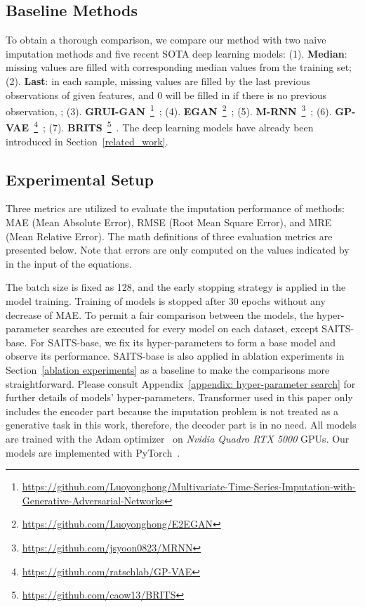 \documentclass{article}
\begin{document}
\subsection{Baseline Methods}
To obtain a thorough comparison, we compare our method with two naive imputation methods and five recent SOTA deep learning models: 
(1). \textbf{Median}: missing values are filled with corresponding median values from the training set; (2). \textbf{Last}: in each sample, missing values are filled by the last previous observations of given features, and 0 will be filled in if there is no previous observation, ; (3). \textbf{GRUI-GAN}~\footnote{\url{https://github.com/Luoyonghong/Multivariate-Time-Series-Imputation-with-Generative-Adversarial-Networks}}~\cite{Luo2018GRUI}; (4). \textbf{EGAN}~\footnote{\url{https://github.com/Luoyonghong/E2EGAN}}~\cite{Luo2019E2GAN}; (5). \textbf{M-RNN}~\footnote{\url{https://github.com/jsyoon0823/MRNN}}~\cite{Yoon2019MRNN}; (6). \textbf{GP-VAE}~\footnote{\url{https://github.com/ratschlab/GP-VAE}}~\cite{Fortuin2020GPVAE}; (7). \textbf{BRITS}~\footnote{\url{https://github.com/caow13/BRITS}}~\cite{Cao2018BRITS}. The deep learning models have already been introduced in Section~\ref{related_work}.

\subsection{Experimental Setup}	\label{experimental_setup}
Three metrics are utilized to evaluate the imputation performance of methods: MAE (Mean Absolute Error), RMSE (Root Mean Square Error), and MRE (Mean Relative Error). The math definitions of three evaluation metrics are presented below. Note that errors are only computed on the values indicated by  in the input of the equations.



The batch size is fixed as 128, and the early stopping strategy is applied in the model training. Training of models is stopped after 30 epochs without any decrease of MAE. To permit a fair comparison between the models, the hyper-parameter searches are executed for every model on each dataset, except SAITS-base. For SAITS-base, we fix its hyper-parameters to form a base model and observe its performance. SAITS-base is also applied in ablation experiments in Section~\ref{ablation experiments} as a baseline to make the comparisons more straightforward. Please consult Appendix~\ref{appendix: hyper-parameter search} for further details of models' hyper-parameters. Transformer used in this paper only includes the encoder part because the imputation problem is not treated as a generative task in this work, therefore, the decoder part is in no need. All models are trained with the Adam optimizer~\cite{Kingma2015Adam} on \textit{Nvidia Quadro RTX 5000} GPUs. Our models are implemented with PyTorch~\cite{Paszke2019PyTorch}.
\end{document}
